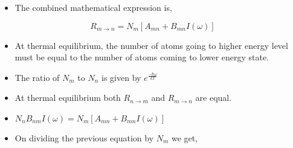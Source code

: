 \documentclass[aspectratio=169]{beamer}
\begin{document}
\begin{frame}{}

	\begin{itemize}
	
		\item The combined mathematical expression is,
		
	\end{itemize}
	
			\begin{equation}
					 R_{m \to n} = N_{m} [A_{mn} + B_{mn} I(\omega)] 
			\end{equation} 
	
\end{frame}

\begin{frame}{}

	\begin{itemize}

		\item At thermal equilibrium, the number of atoms going to higher energy level must be equal to the number of atoms coming to 					  lower energy state. \newline	
		\item The ratio of $ N_{m} $ to $ N_{n} $ is given by $ e^{\frac{-\hbar \omega}{kT}} $  \newline
 
	\end{itemize}
	
\end{frame}

\begin{frame}{}

	\begin{itemize}

		\item At thermal equilibrium both $ R_{n \to m} $ and $ R_{m \to n} $ are equal.  \newline
		\item $ N_{n} B_{nm} I(\omega) = N_{m} [A_{mn} + B_{mn} I(\omega)] $ \newline
		\item On dividing the previous equation by $ N_{m} $ we get, 
		
	\end{itemize}
	
\end{frame}
\end{document}
